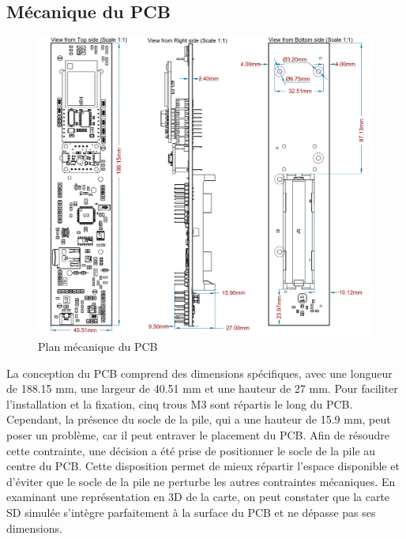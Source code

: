 \subsection{Mécanique du PCB}
{

	\begin{figure}[h]
		\centering
		\includegraphics[width=1\linewidth]{Figures/2221_PCB_MechDims_page-0001}
		\caption{Plan mécanique du PCB}
		\label{fig:2221pcbmechdimspage-0001}
	\end{figure}
	La conception du PCB comprend des dimensions spécifiques, avec une longueur de 188.15 mm, une largeur de 40.51 mm et une hauteur de 27 mm. Pour faciliter l'installation et la fixation, cinq trous M3 sont répartis le long du PCB. Cependant, la présence du socle de la pile, qui a une hauteur de 15.9 mm, peut poser un problème, car il peut entraver le placement du PCB.
	Afin de résoudre cette contrainte, une décision a été prise de positionner le socle de la pile au centre du PCB. Cette disposition permet de mieux répartir l'espace disponible et d'éviter que le socle de la pile ne perturbe les autres contraintes mécaniques.
	En examinant une représentation en 3D de la carte, on peut constater que la carte SD simulée s'intègre parfaitement à la surface du PCB et ne dépasse pas ses dimensions.
}

\clearpage
